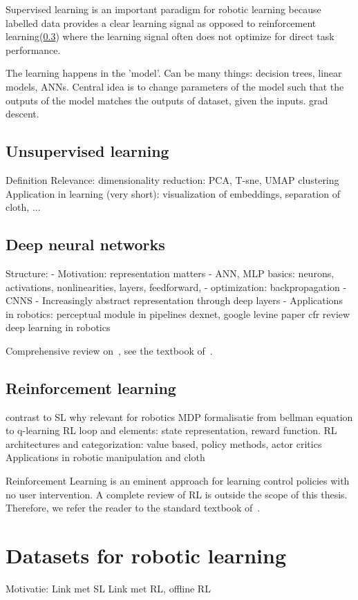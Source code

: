 \documentclass[\home/main.tex]{subfiles}
\begin{document}
Supervised learning is an important paradigm for robotic learning because labelled data provides a clear learning signal as opposed to reinforcement learning(\cref{subsec:lit_rl}) where the learning signal often does not optimize for direct task performance. 

The learning happens in the 'model'. Can be many things: decision trees, linear models, ANNs. 
Central idea is to change parameters of the model such that the outputs of the model matches the outputs of dataset, given the inputs. 
grad descent. 


\subsection{Unsupervised learning}
Definition
Relevance:
	 dimensionality reduction: PCA, T-sne, UMAP 
	 clustering 
Application in learning (very short): visualization of embeddings, separation of cloth, ... 


\subsection{Deep neural networks} \label{subsec:lit_dnn}
Structure: 
	- Motivation: representation matters
	- ANN, MLP basics: neurons, activations, nonlinearities, layers, feedforward, 
	- optimization: backpropagation 
	- CNNS
	- Increasingly abstract representation through deep layers 
	- Applications in robotics:
		perceptual module in pipelines
		dexnet, google levine paper
		cfr review deep learning in robotics 

Comprehensive review on~, see the textbook of~\textcite{Goodfellow2016}.

\subsection{Reinforcement learning} \label{subsec:lit_rl}
contrast to SL 
why relevant for robotics
MDP formalisatie
from bellman equation to q-learning 
RL loop and elements: state representation, reward function. 
RL architectures and categorization: value based, policy methods, actor critics 
Applications in robotic manipulation and cloth 

Reinforcement Learning is an eminent approach for learning control policies with no user intervention. A complete review of RL is outside the scope of this thesis. Therefore, we refer the reader to the standard textbook of~\textcite{Sutton2018}.

\section{Datasets for robotic learning} \label{sec:lit_datasets}
Motivatie:
	Link met SL
	Link met RL, offline RL 
\end{document}
